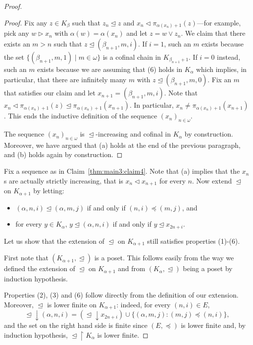 \documentclass[]{amsart}
\theoremstyle{definition}
\theoremstyle{remark}
\begin{document}
\begin{proof}
\begin{proof}
Fix any $z \in K_\beta$ such that $z_n \trianglelefteq z$ and $x_n \lhd \pi_{\alpha (x_n)+1}(z)$---for example, pick any $w \rhd x_n$ with $\alpha(w) = \alpha(x_n)$ and let $z = w \vee z_n$.  We claim that there exists an $m > n$ such that $z \trianglelefteq (\beta_{n+1}, m, i)$. If $i = 1$, such an $m$ exists because the set $\{(\beta_{n+1}, m, 1) \mid m \in \omega\}$ is a cofinal chain in $K_{\beta_{n+1}+1}$. If $i = 0$ instead, such an $m$ exists because we are assuming that (6) holds in $K_\alpha$ which implies, in particular, that there are infinitely many $m$ with $z \trianglelefteq (\beta_{n+1}, m, 0)$. Fix an $m$ that satisfies our claim and let $x_{n+1} = (\beta_{n+1}, m, i)$. Note that $x_n \lhd \pi_{\alpha(x_n) + 1} (z)  \trianglelefteq \pi_{\alpha(x_n) +1}(x_{n+1})$. In particular, $x_n \neq \pi_{\alpha(x_n) +1}(x_{n+1})$. This ends the inductive definition of the sequence  $(x_n)_{n\in\omega}$.


The sequence $(x_n)_{n\in\omega}$ is $\trianglelefteq$-increasing and cofinal in $K_\alpha$ by construction. Moreover, we have argued that (a) holds at the end of the previous paragraph, and (b) holds again by construction. 
\end{proof}

Fix a sequence as in Claim~\ref{thm:main3:claim4}.  Note that (a) implies that the $x_n$s are actually strictly increasing, that is $x_n \lhd x_{n+1}$ for every $n$. Now extend $\trianglelefteq$ on $K_{\alpha+1}$ by letting:
\begin{itemize}
\item $(\alpha, n, i) \trianglelefteq (\alpha, m, j)$ if and only if $(n, i) \preceq (m, j)$, and
\item for every $y \in K_\alpha$, $y \trianglelefteq (\alpha, n, i)$ if and only if $y \trianglelefteq x_{2n+i}$.
\end{itemize}

Let us show  that the extension of $\trianglelefteq$ on $K_{\alpha+1}$ still satisfies properties (1)-(6).

First note that $(K_{\alpha+1}, \trianglelefteq)$ is a poset. This follows easily from the way we defined the extension of $\trianglelefteq$ on $K_{\alpha+1}$ and from $(K_\alpha, \trianglelefteq)$ being a poset by induction hypothesis. 

Properties (2), (3) and (6) follow directly from the definition of our extension. Moreover, $\trianglelefteq$ is lower finite on $K_{\alpha+1}$: indeed, for every $(n,i) \in E$,
\[
{\trianglelefteq} \downarrow (\alpha, n, i) = ({\trianglelefteq} \downarrow x_{2n+i}) \cup \{(\alpha, m, j) : (m,j) \preceq (n, i)\},
\]
and the set on the right hand side is finite since $(E, \preceq)$ is lower finite and, by induction hypothesis, ${\trianglelefteq} \upharpoonright K_\alpha$ is lower finite.


\end{proof}
\end{document}
